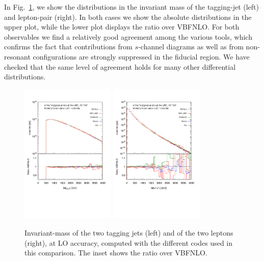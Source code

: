 In Fig.~\ref{fig:wg1_mjj-llLO}, we show the distributions in the invariant mass of the tagging-jet (left) and lepton-pair (right).
In both cases we show the absolute distributions in the upper plot, while the lower plot displays the ratio over {\sc VBFNLO}.
For both observables we find a relatively good agreement among the various tools, which confirms the fact that contributions from $s$-channel diagrams as well as from non-resonant configurations are strongly suppressed in the fiducial region.
We have checked that the same level of agreement holds for many other differential distributions.


 \begin{figure}[h!]
   \centering
   \includegraphics[width=0.4\textwidth,angle=0,clip=true,trim={0.4cm 2.5cm 0.cm 1.cm}]{figures/mjj_LO.pdf}
   \includegraphics[width=0.4\textwidth,angle=0,clip=true,trim={0.4cm 2.5cm 0.cm 1.cm}]{figures/mll_LO.pdf}
\caption{\label{fig:wg1_mjj-llLO} Invariant-mass of the two tagging jets (left) and of the two leptons (right), at LO accuracy, 
computed with the different codes used in this comparison. The inset shows the ratio over {\sc VBFNLO}.
}
\end{figure}
